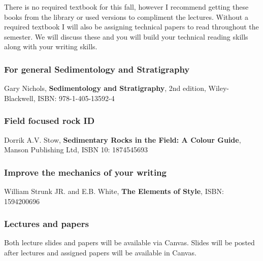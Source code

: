 \documentclass[11pt,]{article}
\begin{document}
There is no required textbook for this fall, however I recommend getting
these books from the library or used versions to compliment the
lectures. Without a required textbook I will also be assigning technical
papers to read throughout the semester. We will discuss these and you
will build your technical reading skills along with your writing skills.

\hypertarget{for-general-sedimentology-and-stratigraphy}{%
\subsubsection{For general Sedimentology and
Stratigraphy}\label{for-general-sedimentology-and-stratigraphy}}

Gary Nichols, \textbf{Sedimentology and Stratigraphy}, 2nd edition,
Wiley-Blackwell, ISBN: 978-1-405-13592-4

\hypertarget{field-focused-rock-id}{%
\subsubsection{Field focused rock ID}\label{field-focused-rock-id}}

Dorrik A.V. Stow, \textbf{Sedimentary Rocks in the Field: A Colour
Guide}, Manson Publishing Ltd, ISBN 10: 1874545693

\hypertarget{improve-the-mechanics-of-your-writing}{%
\subsubsection{Improve the mechanics of your
writing}\label{improve-the-mechanics-of-your-writing}}

William Strunk JR. and E.B. White, \textbf{The Elements of Style}, ISBN:
1594200696

\hypertarget{lectures-and-papers}{%
\subsubsection{Lectures and papers}\label{lectures-and-papers}}

Both lecture slides and papers will be available via Canvas. Slides will
be posted after lectures and assigned papers will be available in
Canvas.

\newpage
\end{document}
